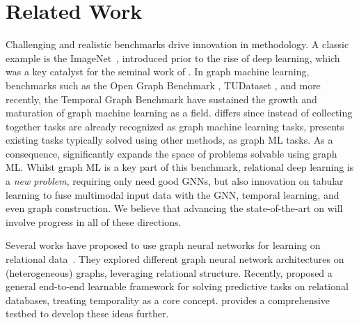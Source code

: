\section{Related Work}
\label{sec:related}

 Challenging and realistic benchmarks drive innovation in methodology. A classic example is the ImageNet~\citep{deng2009imagenet},  introduced prior to the rise of deep learning, which was a key catalyst for the seminal work of \cite{krizhevsky2017imagenet}. In graph machine learning, benchmarks such as the Open Graph Benchmark \citep{hu2020open}, TUDataset \citep{morris2020tudataset}, and more recently, the Temporal Graph Benchmark \citep{huang2024temporal} have sustained the growth and maturation of graph machine learning as a field.
\relbench differs since instead of collecting together tasks are already recognized as graph machine learning tasks, \relbench presents existing tasks typically solved using other methods, as graph ML tasks. As a consequence, \relbench significantly expands the space of problems solvable using graph ML. Whilst graph ML is a key part of this benchmark, relational deep learning is a \emph{new problem}, requiring only need good GNNs, but also innovation on tabular learning to fuse multimodal input data with the GNN, temporal learning, and even graph construction. We believe that advancing the state-of-the-art on \relbench will involve progress in all of these directions.



Several works have proposed to use graph neural networks for learning on relational data~\citep{schlichtkrull2018relational, cvitkovic2020supervisedrd, vsir2021deep, zahradnik2023deep}. They explored different graph neural network architectures on (heterogeneous) graphs, leveraging relational structure. Recently, \cite{fey2023relational} proposed a general end-to-end learnable framework for solving predictive tasks on relational databases, treating temporality as a core concept. 
\relbench provides a comprehensive testbed to develop these ideas further. 

